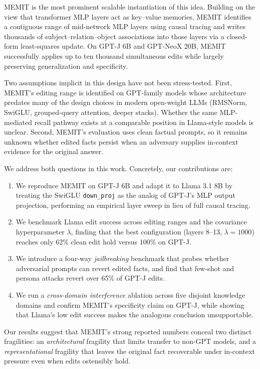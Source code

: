 \documentclass[11pt]{article}
\begin{document}
MEMIT is the most prominent scalable instantiation of this idea. Building on the view that transformer MLP layers act as key--value memories, MEMIT identifies a contiguous range of mid-network MLP layers using causal tracing and writes thousands of subject--relation--object associations into those layers via a closed-form least-squares update. On GPT-J 6B and GPT-NeoX 20B, MEMIT successfully applies up to ten thousand simultaneous edits while largely preserving generalization and specificity.

Two assumptions implicit in this design have not been stress-tested. First, MEMIT's editing range is identified on GPT-family models whose architecture predates many of the design choices in modern open-weight LLMs (RMSNorm, SwiGLU, grouped-query attention, deeper stacks). Whether the same MLP-mediated recall pathway exists at a comparable position in Llama-style models is unclear. Second, MEMIT's evaluation uses clean factual prompts, so it remains unknown whether edited facts persist when an adversary supplies in-context evidence for the original answer.

We address both questions in this work. Concretely, our contributions are:
\begin{enumerate}
    \item We reproduce MEMIT on GPT-J 6B and adapt it to Llama 3.1 8B by treating the SwiGLU \texttt{down\_proj} as the analog of GPT-J's MLP output projection, performing an empirical layer sweep in lieu of full causal tracing.
    \item We benchmark Llama edit success across editing ranges and the covariance hyperparameter $\lambda$, finding that the best configuration (layers 8--13, $\lambda{=}1000$) reaches only 62\% clean edit hold versus 100\% on GPT-J.
    \item We introduce a four-way \emph{jailbreaking} benchmark that probes whether adversarial prompts can revert edited facts, and find that few-shot and persona attacks revert over 65\% of GPT-J edits.
    \item We run a \emph{cross-domain interference} ablation across five disjoint knowledge domains and confirm MEMIT's specificity claim on GPT-J, while showing that Llama's low edit success makes the analogous conclusion unsupportable.
\end{enumerate}

Our results suggest that MEMIT's strong reported numbers conceal two distinct fragilities: an \emph{architectural} fragility that limits transfer to non-GPT models, and a \emph{representational} fragility that leaves the original fact recoverable under in-context pressure even when edits ostensibly hold.
\end{document}
